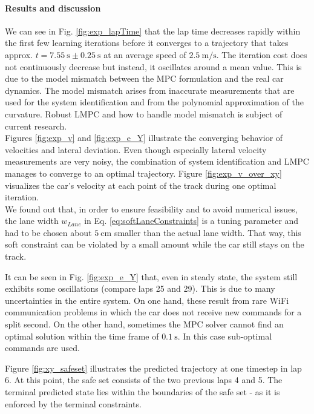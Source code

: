 \paragraph{Results and discussion}
We can see in Fig. \ref{fig:exp_lapTime} that the lap time decreases rapidly within the first few learning iterations before it converges to a trajectory that takes approx. $t=\SI{7.55}{\second} \pm \SI{0.25}{\second}$ at an average speed of $\SI{2.5}{\meter\per\second}$. The iteration cost does not continuously decrease but instead, it oscillates around a mean value. This is due to the model mismatch between the MPC formulation and the real car dynamics. The model mismatch arises from inaccurate measurements that are used for the system identification and from the polynomial approximation of the curvature. Robust LMPC and how to handle model mismatch is subject of current research.\\
Figures \ref{fig:exp_v} and \ref{fig:exp_e_Y} illustrate the converging behavior of velocities and lateral deviation. Even though especially lateral velocity measurements are very noisy, the combination of system identification and LMPC manages to converge to an optimal trajectory.
Figure \ref{fig:exp_v_over_xy} visualizes the car's velocity at each point of the track during one optimal iteration.%
\\
We found out that, in order to ensure feasibility and to avoid numerical issues, the lane width $w_{Lane}$ in Eq. \eqref{eq:softLaneConstraints} is a tuning parameter and had to be chosen about $\SI{5}{\centi\meter}$ smaller than the actual lane width. That way, this soft constraint can be violated by a small amount while the car still stays on the track.

It can be seen in Fig. \ref{fig:exp_e_Y} that, even in steady state, the system still exhibits some oscillations (compare laps 25 and 29). This is due to many uncertainties in the entire system. On one hand, these result from rare WiFi communication problems in which the car does not receive new commands for a split second. On the other hand, sometimes the MPC solver cannot find an optimal solution within the time frame of $\SI{0.1}{\second}$. In this case sub-optimal commands are used.

Figure \ref{fig:xy_safeset} illustrates the predicted trajectory at one timestep in lap 6. At this point, the safe set consists of the two previous laps 4 and 5. The terminal predicted state lies within the boundaries of the safe set - as it is enforced by the terminal constraints.

